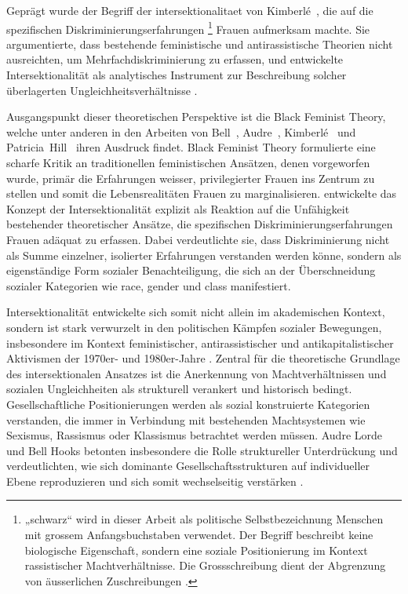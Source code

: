 Geprägt wurde der Begriff der \gls{intersektionalitaet} von Kimberlé~\textcite{crenshawMappingMarginsIntersectionality1991}, die auf die spezifischen Diskriminierungserfahrungen \footnote{„\gls{schwarz}“ wird in dieser Arbeit als politische Selbstbezeichnung  Menschen mit grossem Anfangsbuchstaben verwendet. Der Begriff beschreibt keine biologische Eigenschaft, sondern eine soziale Positionierung im Kontext rassistischer Machtverhältnisse. Die Grossschreibung dient der Abgrenzung von äusserlichen Zuschreibungen \parencite{oguntoyeFarbeBekennenAfrodeutsche1986}.} Frauen aufmerksam machte. Sie argumentierte, dass bestehende feministische und antirassistische Theorien nicht ausreichten, um Mehrfachdiskriminierung zu erfassen, und entwickelte Intersektionalität als analytisches Instrument zur Beschreibung solcher überlagerten Ungleichheitsverhältnisse \parencite[\gls{vgl}][]{hancockWhenMultiplicationDoesnt2007}.

Ausgangspunkt dieser theoretischen Perspektive ist die Black Feminist Theory, welche unter anderen in den Arbeiten von Bell~\textcite{hooksAintWomanBlack1981}, Audre~\textcite{lordeSisterOutsiderEssays1984}, Kimberlé~\textcite{crenshawMappingMarginsIntersectionality1991} und Patricia~Hill~\textcite{collinsBlackFeministThought2002} ihren Ausdruck findet. Black Feminist Theory formulierte eine scharfe Kritik an traditionellen feministischen Ansätzen, denen vorgeworfen wurde, primär die Erfahrungen weisser, privilegierter Frauen ins Zentrum zu stellen und somit die Lebensrealitäten  Frauen zu marginalisieren. \textcite{crenshawMappingMarginsIntersectionality1991} entwickelte das Konzept der Intersektionalität explizit als Reaktion auf die Unfähigkeit bestehender theoretischer Ansätze, die spezifischen Diskriminierungserfahrungen  Frauen adäquat zu erfassen. Dabei verdeutlichte sie, dass Diskriminierung nicht als Summe einzelner, isolierter Erfahrungen verstanden werden könne, sondern als eigenständige Form sozialer Benachteiligung, die sich an der Überschneidung sozialer Kategorien wie \gls{race}, \gls{gender} und \gls{class} manifestiert.

Intersektionalität entwickelte sich somit nicht allein im akademischen Kontext, sondern ist stark verwurzelt in den politischen Kämpfen sozialer Bewegungen, insbesondere im Kontext feministischer, antirassistischer und antikapitalistischer Aktivismen der 1970er- und 1980er-Jahre \parencite{collinsBlackFeministThought2002}. Zentral für die theoretische Grundlage des intersektionalen Ansatzes ist die Anerkennung von Machtverhältnissen und sozialen Ungleichheiten als strukturell verankert und historisch bedingt. Gesellschaftliche Positionierungen werden als sozial konstruierte Kategorien verstanden, die immer in Verbindung mit bestehenden Machtsystemen wie Sexismus, Rassismus oder Klassismus betrachtet werden müssen. Audre Lorde und Bell Hooks betonten insbesondere die Rolle struktureller Unterdrückung und verdeutlichten, wie sich dominante Gesellschaftsstrukturen auf individueller Ebene reproduzieren und sich somit wechselseitig verstärken \parencite{collinsBlackFeministThought2002, hancockWhenMultiplicationDoesnt2007}.

